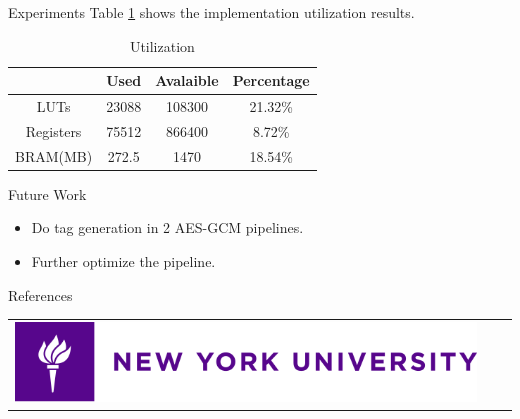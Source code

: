 \documentclass[final]{beamer}
\newlength{\onecolwid}
\begin{document}
\begin{frame}[t]
\begin{columns}[t]
\begin{column}{\onecolwid}
\begin{block}{Experiments}
Table \ref{util} shows the implementation utilization results.

\begin{table}
\vspace{2ex}
\begin{tabular}{cccc}
\toprule
 & \textbf{Used} & \textbf{Avalaible} & \textbf{Percentage} \\
\midrule
LUTs & 23088 & 108300 & 21.32\%\\
Registers  & 75512 & 866400 & 8.72\% \\
BRAM(MB) & 272.5 & 1470 & 18.54\% \\
\bottomrule
\end{tabular}
\caption{Utilization}
\label{util}
\end{table}

\end{block}


\begin{block}{Future Work}

\begin{itemize}
\item Do tag generation in 2 AES-GCM pipelines.
\item Further optimize the pipeline.
\end{itemize}

\end{block}


\begin{block}{References}

\small{
\vspace{0.75in}}
\begin{center}
\begin{tabular}{ccc}
\includegraphics[width=\linewidth]{nyu-logo} %
\end{tabular}
\end{center}
\end{block}


\end{column}
\end{columns}
\end{frame}
\end{document}
